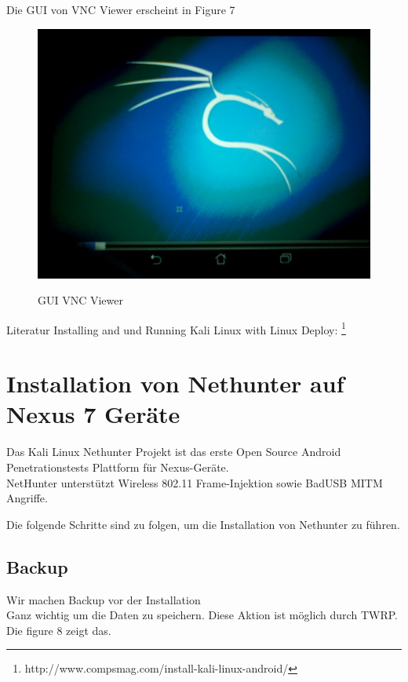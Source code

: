 \documentclass[11pt,a4paper]{article}
\begin{document}
Die GUI von VNC Viewer erscheint in Figure 7 \\
\begin{figure}[H]
\begin{center} \includegraphics[scale=0.1]{./Image/img7}  \\
\caption{GUI VNC Viewer}
\end{center}
\end{figure} 

Literatur Installing and und Running Kali Linux with Linux Deploy: \footnote{http://www.compsmag.com/install-kali-linux-android/}

\section {Installation von Nethunter auf Nexus 7 Geräte}
Das Kali Linux Nethunter Projekt ist das erste Open Source Android Penetrationstests Plattform für Nexus-Geräte. \\
NetHunter unterstützt Wireless 802.11 Frame-Injektion sowie BadUSB MITM Angriffe. 

Die folgende Schritte sind zu folgen, um die Installation von Nethunter zu führen.

\subsection{Backup}
Wir machen Backup vor der Installation \\  
Ganz wichtig um die Daten zu speichern. Diese Aktion ist möglich durch TWRP. Die figure 8 zeigt das.
\end{document}
